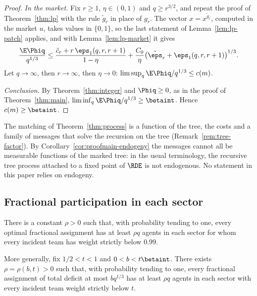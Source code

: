 \begin{proof}
\emph{In the market.} Fix $r\ge1$, $\eta\in(0,1)$ and $q\ge r^{3/2}$, and repeat the proof
of Theorem~\ref{thm:lp} with the rule $\tilde g_r$ in place of $g_r$. The vector
$x=x^{\tilde g_r}$, computed in the market $u$, takes values in $\{0,1\}$, so the last
statement of Lemma~\ref{lem:lp-patch} applies, and with Lemma~\ref{lem:lp-market} it gives
\[
\frac{\E\Phiq}{q^{1/3}}\le\frac{\tilde c_r+r\,\eps_1(q,r,r+1)}{1-\eta}
+\frac{C_0}{\eta}\bigl(\tilde\eps_r+\eps_1(q,r,r+1)\bigr)^{1/3}.
\]
Let $q\to\infty$, then $r\to\infty$, then $\eta\to0$:
$\limsup_q\E\Phiq/q^{1/3}\le c(m)$.

\emph{Conclusion.} By Theorem~\ref{thm:integer} and $\Phiq\ge0$, as in the proof of
Theorem~\ref{thm:main}, $\liminf_q\E\Phiq/q^{1/3}\ge\betaint$. Hence $c(m)\ge\betaint$.
\end{proof}

\begin{remark}\label{rem:proofmain-endogeny}
The matching of Theorem~\ref{thm:process} is a function of the tree, the costs and a family
of messages that solve the recursion on the tree (Remark~\ref{rem:tree-factor}). By
Corollary~\ref{cor:proofmain-endogeny} the messages cannot all be measurable functions of
the marked tree: in the usual terminology, the recursive tree process attached to a fixed
point of $\RDE$ is not endogenous. No statement in this paper relies on endogeny.
\end{remark}

\subsection{Fractional participation in each sector}\label{sec:proofmain-participation}

\begin{corollary}\label{cor:proofmain-participation}
There is a constant $\rho>0$ such that, with probability tending to one, every optimal
fractional assignment has at least $\rho q$ agents in each sector for whom every
incident team has weight strictly below $0.99$.

More generally, fix $1/2<t<1$ and $0<b<t\betaint$. There exists $\rho=\rho(b,t)>0$
such that, with probability tending to one, every fractional assignment of total
deficit at most $bq^{1/3}$ has at least $\rho q$ agents in each sector with every
incident team weight strictly below $t$.
\end{corollary}

